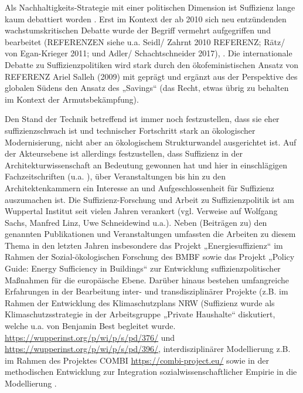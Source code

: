 \documentclass[a4paper,11pt,twoside]{scrartcl}
\begin{document}
Als Nachhaltigkeits-Strategie mit einer politischen Dimension ist Suffizienz lange kaum debattiert worden \cite{Winterfeld2002}. Erst im Kontext der ab 2010 sich neu entzündenden wachstumskritischen Debatte wurde der Begriff vermehrt aufgegriffen und bearbeitet (REFERENZEN siehe u.a. Seidl/ Zahrnt 2010 REFERENZ; Rätz/ von Egan-Krieger 2011; und Adler/ Schachtschneider 2017), \cite{Schneidewind2013,Winterfeld2017,Linz2015,Bierwirth2015,Thomas2015}. Die internationale Debatte zu Suffizienzpolitiken wird stark durch den ökofeministischen Ansatz von REFERENZ Ariel Salleh (2009) mit geprägt und ergänzt aus der Perspektive des globalen Südens den Ansatz des „Savings“ (das Recht, etwas übrig zu behalten im Kontext der Armutsbekämpfung).

Den Stand der Technik betreffend ist immer noch festzustellen, dass sie eher suffizienzschwach ist und technischer Fortschritt stark an ökologischer Modernisierung, nicht aber an ökologischem Strukturwandel ausgerichtet ist. Auf der Akteursebene ist allerdings festzustellen, dass Suffizienz in der Architekturwissenschaft an Bedeutung gewonnen hat und hier in einschlägigen Fachzeitschriften (u.a. \cite{Architekt2015}), über Veranstaltungen bis hin zu den Architektenkammern ein Interesse an und Aufgeschlossenheit für Suffizienz auszumachen ist. 
Die Suffizienz-Forschung und Arbeit zu Suffizienzpolitik ist am Wuppertal Institut seit vielen Jahren verankert (vgl. Verweise auf Wolfgang Sachs, Manfred Linz, Uwe Schneidewind u.a.). Neben (Beiträgen zu) den genannten Publikationen und Veranstaltungen umfassten die Arbeiten zu diesem Thema in den letzten Jahren insbesondere das Projekt „Energiesuffizienz“ \cite{EnergiesuffizienzProjekt} im Rahmen der Sozial-ökologischen Forschung des BMBF sowie das Projekt „Policy Guide: Energy Sufficiency in Buildings“ \cite{EnergySufficiencyProjekt} zur Entwicklung suffizienzpolitischer Maßnahmen für die europäische Ebene. Darüber hinaus bestehen umfangreiche Erfahrungen in der Bearbeitung inter- und transdisziplinärer Projekte (z.B. im Rahmen der Entwicklung des Klimaschutzplans NRW (Suffizienz wurde als Klimaschutzsstrategie in der Arbeitsgruppe „Private Haushalte“ diskutiert, welche u.a. von Benjamin Best begleitet wurde. \url{https://wupperinst.org/p/wi/p/s/pd/376/} und \url{https://wupperinst.org/p/wi/p/s/pd/396/}, interdisziplinärer Modellierung z.B. im Rahmen des Projektes COMBI \url{https://combi-project.eu/} sowie in der methodischen Entwicklung zur Integration sozialwissenschaftlicher Empirie in die Modellierung \cite{Bierwirth2016}.\\
\end{document}
